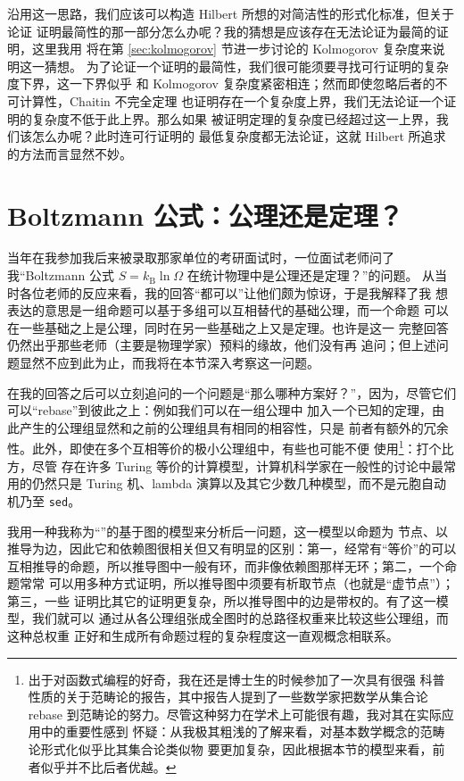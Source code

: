 沿用这一思路，我们应该可以构造 Hilbert 所想的对简洁性的形式化标准，但关于论证
证明最简性的那一部分怎么办呢？我的猜想是应该存在无法论证为最简的证明，这里我用
将在第 \ref{sec:kolmogorov} 节进一步讨论的 Kolmogorov 复杂度来说明这一猜想。
为了论证一个证明的最简性，我们很可能须要寻找可行证明的复杂度下界，这一下界似乎
和 Kolmogorov 复杂度紧密相连；然而即使忽略后者的不可计算性，Chaitin 不完全定理
也证明存在一个复杂度上界，我们无法论证一个证明的复杂度不低于此上界。那么如果
被证明定理的复杂度已经超过这一上界，我们该怎么办呢？此时连可行证明的
最低复杂度都无法论证，这就 Hilbert 所追求的方法而言显然不妙。

\section{Boltzmann 公式：公理还是定理？}\label{sec:boltzmann}

当年在我参加我后来被录取那家单位的考研面试时，一位面试老师问了我“Boltzmann
公式 $S = k_\mathrm{B} \ln\varOmega$ 在统计物理中是公理还是定理？”的问题。
从当时各位老师的反应来看，我的回答“都可以”让他们颇为惊讶，于是我解释了我
想表达的意思是一组命题可以基于多组可以互相替代的基础公理，而一个命题
可以在一些基础之上是公理，同时在另一些基础之上又是定理。也许是这一
完整回答仍然出乎那些老师（主要是物理学家）预料的缘故，他们没有再
追问；但上述问题显然不应到此为止，而我将在本节深入考察这一问题。

在我的回答之后可以立刻追问的一个问题是“那么哪种方案好？”，因为，尽管它们可以“rebase”到彼此之上：例如我们可以在一组公理中
加入一个已知的定理，由此产生的公理组显然和之前的公理组具有相同的相容性，只是
前者有额外的冗余性。此外，即使在多个互相等价的极小公理组中，有些也可能不便
使用\footnote{出于对函数式编程的好奇，我在还是博士生的时候参加了一次具有很强
科普性质的关于范畴论的报告，其中报告人提到了一些数学家把数学从集合论 rebase
到范畴论的努力。尽管这种努力在学术上可能很有趣，我对其在实际应用中的重要性感到
怀疑：从我极其粗浅的了解来看，对基本数学概念的范畴论形式化似乎比其集合论类似物
要更加复杂，因此根据本节的模型来看，前者似乎并不比后者优越。}：打个比方，尽管
存在许多 Turing 等价的计算模型，计算机科学家在一般性的讨论中最常用的仍然只是
Turing 机、lambda 演算以及其它少数几种模型，而不是元胞自动机乃至 \verb|sed|。

我用一种我称为“”的基于图的模型来分析后一问题，这一模型以命题为
节点、以推导为边，因此它和依赖图很相关但又有明显的区别：第一，经常有“等价”的可以
互相推导的命题，所以推导图中一般有环，而非像依赖图那样无环；第二，一个命题常常
可以用多种方式证明，所以推导图中须要有析取节点（也就是“虚节点”）；第三，一些
证明比其它的证明更复杂，所以推导图中的边是带权的。有了这一模型，我们就可以
通过从各公理组张成全图时的总路径权重来比较这些公理组，而这种总权重
正好和生成所有命题过程的复杂程度这一直观概念相联系。

